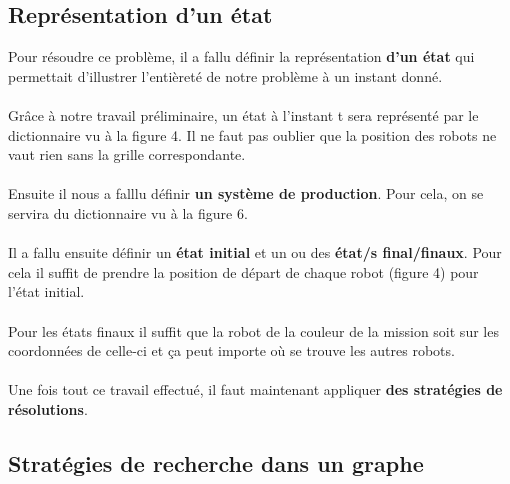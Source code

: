 \documentclass{article}
\begin{document}
\subsection{Représentation d'un état}
Pour résoudre ce problème, il a fallu définir la représentation \textbf{d'un état} qui permettait d'illustrer l'entièreté de notre problème à un instant donné.\\\\ 
Grâce à notre travail préliminaire, un état à l'instant t sera représenté par le dictionnaire vu à la figure 4. Il ne faut pas oublier que la position des robots ne vaut rien sans la grille correspondante. \\\\
Ensuite il nous a falllu définir \textbf{un système de production}. Pour cela, on se servira du dictionnaire vu à la figure 6.\\\\
Il a fallu ensuite définir un \textbf{état initial} et un ou des \textbf{état/s final/finaux}. Pour cela il suffit de prendre la position de départ de chaque robot (figure 4) pour l'état initial.\\\\
Pour les états finaux il suffit que la robot de la couleur de la mission soit sur les coordonnées de celle-ci et ça peut importe où se trouve les autres robots.\\\\
Une fois tout ce travail effectué, il faut maintenant appliquer \textbf{des stratégies de résolutions}.
\subsection{Stratégies de recherche dans un graphe}
\end{document}
